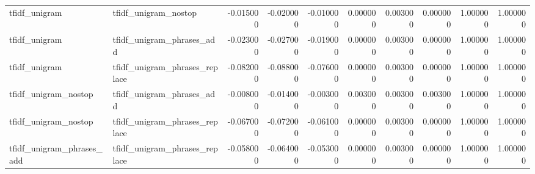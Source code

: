\begin{tabular}{llrrrrrrrr}
tfidf_unigram & tfidf_unigram_nostop & -0.015000 & -0.020000 & -0.010000 & 0.000000 & 0.003000 & 0.000000 & 1.000000 & 1.000000 \\
tfidf_unigram & tfidf_unigram_phrases_add & -0.023000 & -0.027000 & -0.019000 & 0.000000 & 0.003000 & 0.000000 & 1.000000 & 1.000000 \\
tfidf_unigram & tfidf_unigram_phrases_replace & -0.082000 & -0.088000 & -0.076000 & 0.000000 & 0.003000 & 0.000000 & 1.000000 & 1.000000 \\
tfidf_unigram_nostop & tfidf_unigram_phrases_add & -0.008000 & -0.014000 & -0.003000 & 0.003000 & 0.003000 & 0.003000 & 1.000000 & 1.000000 \\
tfidf_unigram_nostop & tfidf_unigram_phrases_replace & -0.067000 & -0.072000 & -0.061000 & 0.000000 & 0.003000 & 0.000000 & 1.000000 & 1.000000 \\
tfidf_unigram_phrases_add & tfidf_unigram_phrases_replace & -0.058000 & -0.064000 & -0.053000 & 0.000000 & 0.003000 & 0.000000 & 1.000000 & 1.000000 \\
\bottomrule
\end{tabular}
